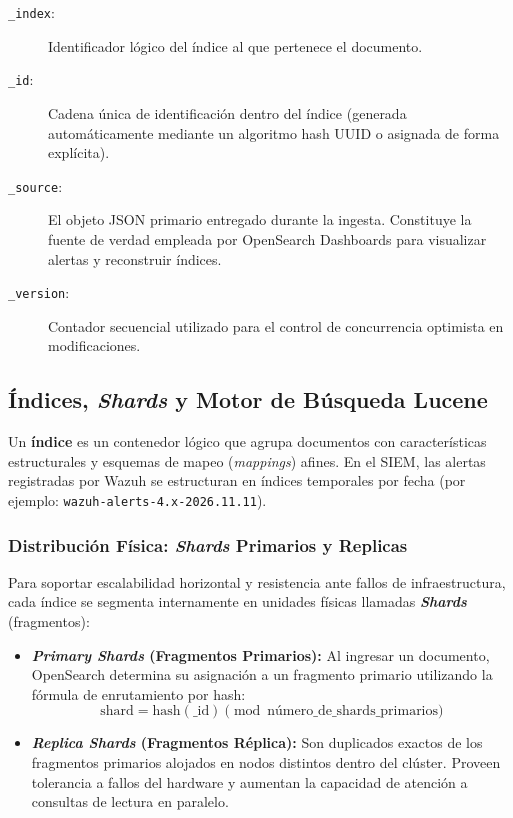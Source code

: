 \begin{description}
    \item[\texttt{\_index}:] Identificador lógico del índice al que pertenece el documento.
    \item[\texttt{\_id}:] Cadena única de identificación dentro del índice (generada automáticamente mediante un algoritmo hash UUID o asignada de forma explícita).
    \item[\texttt{\_source}:] El objeto JSON primario entregado durante la ingesta. Constituye la fuente de verdad empleada por OpenSearch Dashboards para visualizar alertas y reconstruir índices.
    \item[\texttt{\_version}:] Contador secuencial utilizado para el control de concurrencia optimista en modificaciones.
\end{description}

\subsection{Índices, \textit{Shards} y Motor de Búsqueda Lucene}

Un \textbf{índice} es un contenedor lógico que agrupa documentos con características estructurales y esquemas de mapeo (\textit{mappings}) afines. En el SIEM, las alertas registradas por Wazuh se estructuran en índices temporales por fecha (por ejemplo: \texttt{wazuh-alerts-4.x-2026.11.11}).

\subsubsection{Distribución Física: \textit{Shards} Primarios y Replicas}
Para soportar escalabilidad horizontal y resistencia ante fallos de infraestructura, cada índice se segmenta internamente en unidades físicas llamadas \textbf{\textit{Shards}} (fragmentos):

\begin{itemize}
    \item \textbf{\textit{Primary Shards} (Fragmentos Primarios):} Al ingresar un documento, OpenSearch determina su asignación a un fragmento primario utilizando la fórmula de enrutamiento por hash:
    \[
    \text{shard} = \text{hash}(\text{\_id}) \pmod{\text{número\_de\_shards\_primarios}}
    \]
    \item \textbf{\textit{Replica Shards} (Fragmentos Réplica):} Son duplicados exactos de los fragmentos primarios alojados en nodos distintos dentro del clúster. Proveen tolerancia a fallos del hardware y aumentan la capacidad de atención a consultas de lectura en paralelo.
\end{itemize}

